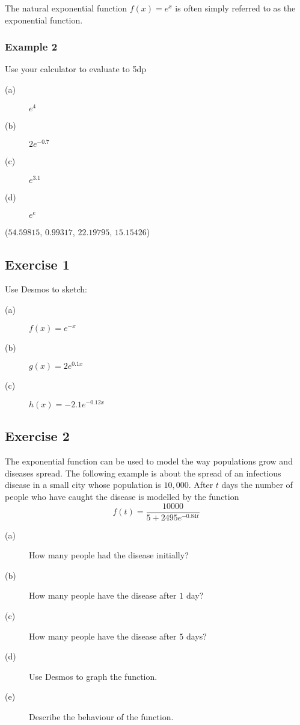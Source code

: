 The natural exponential function $f (x) =e^{x}$ is often simply referred to as the exponential function. 

\subsubsection{Example 2}
Use your calculator to evaluate to 5dp 


\begin{description}
\item [(a)] $e^{4}$ 

\item [(b)] $2 e^{ -0.7}$ 

\item [(c)] $e^{3.1}$ 

\item [(d)] $e^{e}$ \end{description}

($54.59815$, $0.99317$, $22.19795$, $15.15426$) 

\subsection{Exercise 1}
Use Desmos to sketch: 

\begin{description}
\item [(a)] $f (x) =e^{ -x}$ 

\item [(b)] $g (x) =2 e^{0.1 x}$ 

\item [(c)] $h (x) = -2.1 e^{ -0.12 x}$ \end{description}

\subsection{Exercise 2}
The exponential function can be used to model the way populations grow and diseases spread. The following
example is about the spread of an infectious disease in a small city whose population is $10,000$. After $t$ days the number of people who have caught the disease is modelled by the function
\begin{equation*}f (t) =\frac{10000}{5 +2495 e^{ -0.84 t}}
\end{equation*}


\begin{description}
\item [(a)] How many people had the disease initially? 

\item [(b)]
How many people have the disease after $1$ day? 

\item [(c)] How many people
have the disease after $5$ days? 

\item [(d)] Use Desmos
to graph the function. 

\item [(e)] Describe the behaviour
of the function. \end{description}

